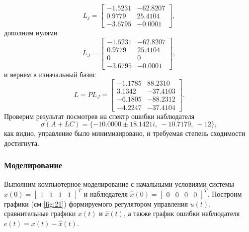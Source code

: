 \begin{equation*}
    L_j=\begin{bmatrix}
        -1.5231 & -62.8207 \\
         0.9779 &  25.4104 \\
        -3.6795 &  -0.0001
    \end{bmatrix},
\end{equation*}
дополним нулями
\begin{equation*}
    L_J=\begin{bmatrix}
        -1.5231 & -62.8207 \\
         0.9779 &  25.4104 \\
         0&0\\
        -3.6795 &  -0.0001
    \end{bmatrix},
\end{equation*}
и вернем в изначальный базис
\begin{equation}
    L=PL_J=\begin{bmatrix}
        -1.1785 &  88.2310 \\
         3.1342 & -37.4103 \\
        -6.1805 & -88.2312 \\
        -4.2247 & -37.4104
    \end{bmatrix}.
    \label{eq:L10}
\end{equation}
Проверим результат посмотрев на спектр ошибки наблюдателя
\begin{equation*}
    \sigma(A+LC)=\{-10.0000 \pm 18.1421i,\ -10.7179,\ -12 \},
\end{equation*}
как видно, управление было минимизировано, и требуемая степень сходимости достигнута.

\subsubsection{Моделирование}

Выполним компьютерное моделирование с начальными условиями системы
$x(0)=\begin{bmatrix}
    1&1&1&1
\end{bmatrix}^T$ и наблюдателя $\hat x(0)=\begin{bmatrix}
    0&0&0&0
\end{bmatrix}^T.$ Построим графики (см \autoref{fig:21})
формируемого регулятором управления $u(t)$, сравнительные графики $x(t)$ и
$\hat x(t)$, а также график ошибки наблюдателя $e(t) = x(t) -\hat x(t).$

